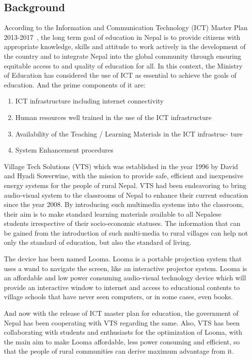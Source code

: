 \documentclass[12pt, a4paper]{article}
\begin{document}
\subsection{Background}
According to the Information and Communication Technology (ICT) Master Plan 2013-2017~\cite{kir}, the long term
goal of education in Nepal is to provide citizens with appropriate knowledge,
skills and attitude to work actively in the development of the country and to
integrate Nepal into the global community through ensuring equitable access
to and quality of education for all. In this context, the Ministry of Education
has considered the use of ICT as essential to achieve the goals of education. And the prime components of it are:
\begin{enumerate}
\item ICT infrastructure including internet connectivity
\item Human resources well trained in the use of the ICT infrastructure
\item Availability of the Teaching / Learning Materials in the ICT infrastruc-
ture
\item System Enhancement procedures
\end{enumerate}
Village Tech Solutions (VTS) which was established in the year 1996 by David and Hyadi Sowerwine, with the mission to provide safe, efficient and inexpensive energy systems for the people of rural Nepal. VTS had been endeavoring to bring audio-visual system to the classrooms of Nepal to enhance their current education since the year 2008. By introducing such multimedia systems into the classroom, their aim is to make standard learning materials available to all Nepalese students irrespective of their socio-economic statuses. The information that can be gained from the introduction of such multi-media to rural villages can help not only the
standard of education, but also the standard of living. 

The device has been named Looma. Looma is a portable projection system that uses a wand to navigate the screen, like an interactive projector system. Looma is an affordable and low power consuming audio-visual technology device which will provide an interactive window to internet and access to educational contents to village schools that have never seen computers, or in some cases, even books.

And now with the release of ICT master plan for education, the government
of Nepal has been cooperating with VTS regarding the same. Also, VTS
has been collaborating with students and enthusiasts for the optimization of
Looma, with the main aim to make Looma affordable, less power consuming
and efficient, so that the people of rural communities can derive maximum
advantage from it.
\end{document}
